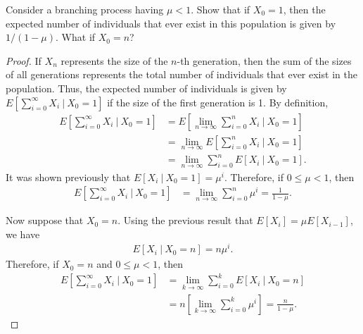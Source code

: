\begin{problem}{4.64}
  Consider a branching process having $\mu < 1$. Show that if $X_0 = 1$, then the expected
  number of individuals that ever exist in this population is given by $1/(1-\mu)$.
  What if $X_0 = n$?
\end{problem}

\begin{proof}
  If $X_n$ represents the size of the $n$-th generation, then the sum of the sizes of all generations represents
  the total number of individuals that ever exist in the population. Thus, the expected number
  of individuals is given by $E\left[\sum_{i=0}^\infty X_i\ |\ X_0 = 1 \right]$ if the size of the first generation is 1.
  By definition,
  \begin{align*}
    E\left[\sum_{i=0}^\infty X_i\ |\ X_0 = 1 \right] &= E\left[\lim_{n\to \infty} \sum_{i=0}^n X_i\ |\ X_0 = 1 \right] \\
    &= \lim_{n\to \infty} E\left[ \sum_{i=0}^n X_i\ |\ X_0 = 1 \right] \\
    &= \lim_{n\to \infty} \sum_{i=0}^n E\left[ X_i\ |\ X_0 = 1 \right].
  \end{align*}
  It was shown previously that $E\left[ X_i\ |\ X_0 = 1 \right] = \mu^i$. Therefore, if $0 \leq \mu < 1$, then
  \begin{align*}
    E\left[\sum_{i=0}^\infty X_i\ |\ X_0 = 1 \right] &= \lim_{n\to\infty}\sum_{i=0}^n \mu^i = \frac{1}{1-\mu}.
  \end{align*}

  Now suppose that $X_0 = n$. Using the previous result that $E[X_i] = \mu E[X_{i-1}]$, we have
  \begin{align*}
    E\left[ X_i\ |\ X_0 = n \right] = n \mu^i.
  \end{align*}
  Therefore, if $X_0 = n$ and $0 \leq \mu < 1$, then
  \begin{align*}
    E\left[\sum_{i=0}^\infty X_i\ |\ X_0 = 1 \right]     &= \lim_{k\to \infty} \sum_{i=0}^k E\left[ X_i\ |\ X_0 = n \right]\\
    &= n\left[\lim_{k\to\infty}\sum_{i=0}^k \mu^i\right] = \frac{n}{1-\mu}.
  \end{align*}
\end{proof}
\newpage
